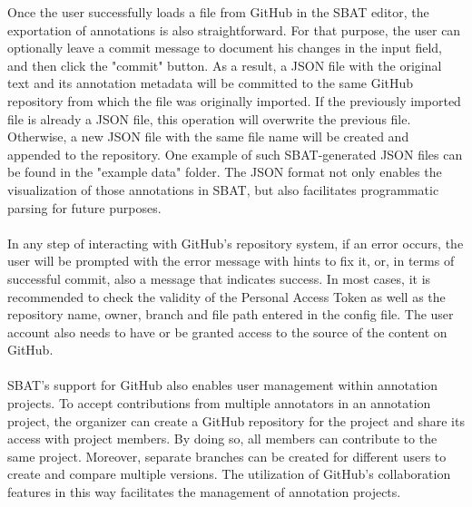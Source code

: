 \documentclass[12ptm a4paper]{article}
\begin{document}
Once the user successfully loads a file from GitHub in the SBAT editor, the exportation of annotations is also straightforward. For that purpose, the user can optionally leave a commit message to document his changes in the input field, and then click the "commit" button. As a result, a JSON file with the original text and its annotation metadata will be committed to the same GitHub repository from which the file was originally imported. If the previously imported file is already a JSON file, this operation will overwrite the previous file. Otherwise, a new JSON file with the same file name will be created and appended to the repository. One example of such SBAT-generated JSON files can be found in the "example data" folder. The JSON format not only enables the visualization of those annotations in SBAT, but also facilitates programmatic parsing for future purposes.\\
\\
In any step of interacting with GitHub's repository system, if an error occurs, the user will be prompted with the error message with hints to fix it, or, in terms of successful commit, also a message that indicates success. In most cases, it is recommended to check the validity of the Personal Access Token as well as the repository name, owner, branch and file path entered in the config file. The user account also needs to have or be granted access to the source of the content on GitHub.\\
\\
SBAT's support for GitHub also enables user management within annotation projects. To accept contributions from multiple annotators in an annotation project, the organizer can create a GitHub repository for the project and share its access with project members. By doing so, all members can contribute to the same project. Moreover, separate branches can be created for different users to create and compare multiple versions. The utilization of GitHub's collaboration features in this way facilitates the management of annotation projects.
\end{document}

